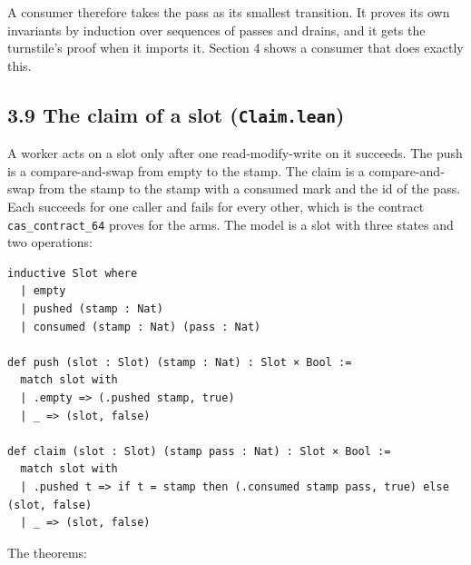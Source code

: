 A consumer therefore takes the pass as its smallest transition. It proves its own invariants by induction over sequences of passes and drains, and it gets the turnstile's proof when it imports it. Section 4 shows a consumer that does exactly this.

\subsection{\texorpdfstring{3.9 The claim of a slot (\texttt{Claim.\allowbreak{}lean})}{3.9 The claim of a slot (Claim.lean)}}

A worker acts on a slot only after one read-modify-write on it succeeds. The push is a compare-and-swap from empty to the stamp. The claim is a compare-and-swap from the stamp to the stamp with a consumed mark and the id of the pass. Each succeeds for one caller and fails for every other, which is the contract \texttt{cas\_\allowbreak{}contract\_\allowbreak{}64} proves for the arms. The model is a slot with three states and two operations:

\begin{Verbatim}
inductive Slot where
  | empty
  | pushed (stamp : Nat)
  | consumed (stamp : Nat) (pass : Nat)

def push (slot : Slot) (stamp : Nat) : Slot × Bool :=
  match slot with
  | .empty => (.pushed stamp, true)
  | _ => (slot, false)

def claim (slot : Slot) (stamp pass : Nat) : Slot × Bool :=
  match slot with
  | .pushed t => if t = stamp then (.consumed stamp pass, true) else (slot, false)
  | _ => (slot, false)
\end{Verbatim}

The theorems:

